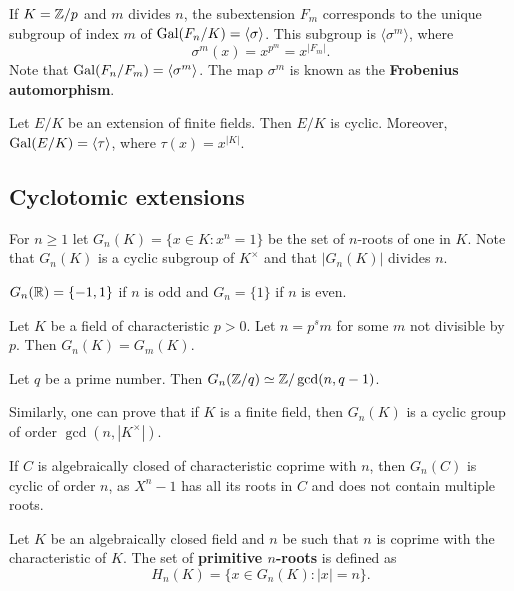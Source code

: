 If $K=\mathbb{Z}/p$ and 
$m$ divides $n$, the subextension $F_m$ corresponds 
to the unique
subgroup of index $m$ of $\operatorname{Gal}(F_n/K)=\langle\sigma\rangle$. This subgroup
is $\langle\sigma^m\rangle$, where
\[
\sigma^m(x)=x^{p^m}=x^{|F_m|}.
\]
Note that $\operatorname{Gal}(F_n/F_m)=\langle\sigma^m\rangle$. 
The map $\sigma^m$ is known as 
the \textbf{Frobenius automorphism}. 

\begin{exercise}
    Let $E/K$ be an extension of finite fields. Then $E/K$ 
    is cyclic. Moreover, $\operatorname{Gal}(E/K)=\langle\tau\rangle$, where $\tau(x)=x^{|K|}$. 
\end{exercise}




\subsection{Cyclotomic extensions}

For $n\geq1$ let $G_n(K)=\{x\in K:x^n=1\}$ be the 
set of $n$-roots of one in $K$. Note that
$G_n(K)$ is a cyclic subgroup of $K^{\times}$ and that 
$|G_n(K)|$ divides $n$. 

\begin{example}
    $G_n(\mathbb{R})=\{-1,1\}$ if $n$ is odd and $G_{n}=\{1\}$ if $n$ is even.
\end{example}

\begin{exercise}
    Let $K$ be a field of characteristic $p>0$. Let $n=p^sm$ for some $m$ not divisible by $p$. 
    Then $G_n(K)=G_m(K)$. 
\end{exercise}

\begin{exercise}
    Let $q$ be a prime number. Then $G_n(\mathbb{Z}/q)\simeq\mathbb{Z}/\gcd(n,q-1)$. 
\end{exercise}

Similarly, one can prove that if $K$ is a finite field, then $G_n(K)$ is a cyclic group
of order $\gcd(n,|K^{\times}|)$. 

\begin{example}
    If $C$ is algebraically closed of characteristic coprime with $n$, 
    then $G_n(C)$ is cyclic of order $n$, as $X^n-1$ 
    has all its roots in $C$ and does not contain multiple roots. 
\end{example}

Let $K$ be an algebraically closed field and $n$ be
such that $n$ is coprime with the characteristic of $K$. The set of 
\textbf{primitive $n$-roots} is defined as 
\[
H_n(K)=\{x\in G_n(K):|x|=n\}.
\]

